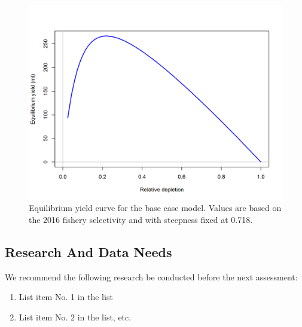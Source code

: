 \documentclass[12pt,]{article}
\begin{document}
\begin{figure}[htbp]
\centering
\includegraphics{r4ss/plots_mod1/yield1_yield_curve.png}
\caption{Equilibrium yield curve for the base case model. Values are
based on the 2016 fishery selectivity and with steepness fixed at 0.718.
\label{fig:Yield_all}}
\end{figure}

\FloatBarrier

\newpage

\subsection*{Research And Data Needs}\label{research-and-data-needs}

We recommend the following research be conducted before the next
assessment:

\begin{enumerate}

\item List item No. 1 in the list

\item List item No. 2 in the list, etc.

\end{enumerate}

\FloatBarrier

\newpage

\renewcommand{\thefigure}{\arabic{figure}}
\renewcommand{\thetable}{\arabic{table}}

\setcounter{figure}{0} \setcounter{table}{0}
\end{document}
